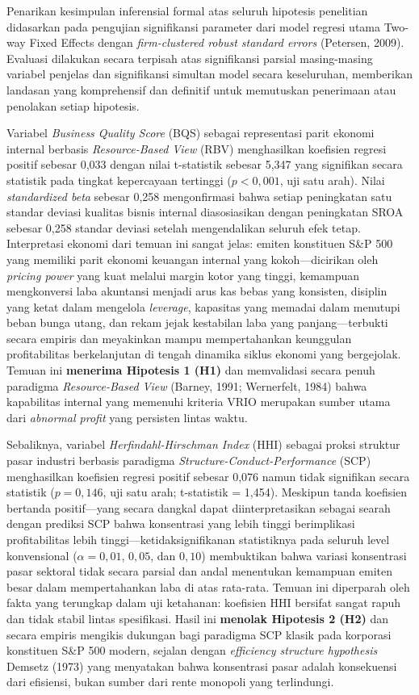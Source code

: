 \documentclass[12pt,a4paper]{article}
\begin{document}
Penarikan kesimpulan inferensial formal atas seluruh hipotesis
penelitian didasarkan pada pengujian signifikansi parameter dari model
regresi utama Two-way Fixed Effects dengan \emph{firm-clustered robust
standard errors} (Petersen, 2009). Evaluasi dilakukan secara terpisah
atas signifikansi parsial masing-masing variabel penjelas dan
signifikansi simultan model secara keseluruhan, memberikan landasan yang
komprehensif dan definitif untuk memutuskan penerimaan atau penolakan
setiap hipotesis.

Variabel \emph{Business Quality Score} (BQS) sebagai representasi parit
ekonomi internal berbasis \emph{Resource-Based View} (RBV) menghasilkan
koefisien regresi positif sebesar 0,033 dengan nilai t-statistik sebesar
5,347 yang signifikan secara statistik pada tingkat kepercayaan
tertinggi (\(p < 0{,}001\), uji satu arah). Nilai \emph{standardized
beta} sebesar 0,258 mengonfirmasi bahwa setiap peningkatan satu standar
deviasi kualitas bisnis internal diasosiasikan dengan peningkatan SROA
sebesar 0,258 standar deviasi setelah mengendalikan seluruh efek tetap.
Interpretasi ekonomi dari temuan ini sangat jelas: emiten konstituen
S\&P 500 yang memiliki parit ekonomi keuangan internal yang
kokoh---dicirikan oleh \emph{pricing power} yang kuat melalui margin
kotor yang tinggi, kemampuan mengkonversi laba akuntansi menjadi arus
kas bebas yang konsisten, disiplin yang ketat dalam mengelola
\emph{leverage}, kapasitas yang memadai dalam menutupi beban bunga
utang, dan rekam jejak kestabilan laba yang panjang---terbukti secara
empiris dan meyakinkan mampu mempertahankan keunggulan profitabilitas
berkelanjutan di tengah dinamika siklus ekonomi yang bergejolak. Temuan
ini \textbf{menerima Hipotesis 1 (H1)} dan memvalidasi secara penuh
paradigma \emph{Resource-Based View} (Barney, 1991; Wernerfelt, 1984)
bahwa kapabilitas internal yang memenuhi kriteria VRIO merupakan sumber
utama dari \emph{abnormal profit} yang persisten lintas waktu.

Sebaliknya, variabel \emph{Herfindahl-Hirschman Index} (HHI) sebagai
proksi struktur pasar industri berbasis paradigma
\emph{Structure-Conduct-Performance} (SCP) menghasilkan koefisien
regresi positif sebesar 0,076 namun tidak signifikan secara statistik
(\(p = 0{,}146\), uji satu arah; t-statistik = 1,454). Meskipun tanda
koefisien bertanda positif---yang secara dangkal dapat diinterpretasikan
sebagai searah dengan prediksi SCP bahwa konsentrasi yang lebih tinggi
berimplikasi profitabilitas lebih tinggi---ketidaksignifikanan
statistiknya pada seluruh level konvensional (\(\alpha = 0{,}01\),
\(0{,}05\), dan \(0{,}10\)) membuktikan bahwa variasi konsentrasi pasar
sektoral tidak secara parsial dan andal menentukan kemampuan emiten
besar dalam mempertahankan laba di atas rata-rata. Temuan ini diperparah
oleh fakta yang terungkap dalam uji ketahanan: koefisien HHI bersifat
sangat rapuh dan tidak stabil lintas spesifikasi. Hasil ini
\textbf{menolak Hipotesis 2 (H2)} dan secara empiris mengikis dukungan
bagi paradigma SCP klasik pada korporasi konstituen S\&P 500 modern,
sejalan dengan \emph{efficiency structure hypothesis} Demsetz (1973)
yang menyatakan bahwa konsentrasi pasar adalah konsekuensi dari
efisiensi, bukan sumber dari rente monopoli yang terlindungi.
\end{document}
